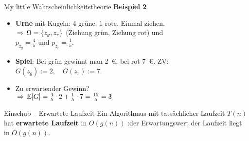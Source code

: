 \begin{frame}{My little Wahrscheinlichkeitstheorie} 
	\textbf{Beispiel 2} \\%
	\begin{itemize}
		\item \textbf{Urne} mit Kugeln: 4 grüne, 1 rote. Einmal ziehen. \\ \pause
		$\impl \Omega = \{z_g, z_r\}$ \quad (Ziehung grün, Ziehung rot) und \\ \pause
		$ p_{z_g} = \frac{4}{5}$ und $p_{z_r} = \frac{1}{5}$.
		\item \textbf{Spiel}:  Bei grün gewinnt man 2~€, bei rot 7~€. \quad ZV: \\ \pause
		$G(z_g) := 2, \quad  G(z_r) := 7$.
		\item Zu erwartender Gewinn? \\ \pause
		$\impl \E[G] = \frac{4}{5} \cdot 2 + \frac{1}{5} \cdot 7 = \fract 15/5 = 3$
	\end{itemize}
\end{frame}

\begin{frame}{Einschub – Erwartete Laufzeit}
	Ein Algorithmus mit tatsächlicher Laufzeit $T(n)$ hat \textbf{erwartete Laufzeit} in $O(g(n))$ :\gdw der Erwartungswert der Laufzeit liegt in $O(g(n))$.
\end{frame}

\iffalse
\begin{frame}{Datenstrukturen}
	\textbf{Freiheit für die Indizierung} \\[0,125cm]
	\begin{itemize}
		\pause
		\item Bisher: Für Index $i$ in einer Datenstruktur der Größe $n$ gilt $ i \in \{0, ..., n-1\} \subset \N_0$
		\pause
		\item Nun: Kein Index mehr
		\pause
		\item Stattdessen: Jedes Element $e$ hat einen eindeutigen Wert $key(e)$ derart, dass $\forall e, e': key(e) = key(e') \Leftrightarrow e = e'$ \\ (setze künftig Elementvergleiche synonym zu Vergleich der $keys$, auch mit $<$ und $>$)
		\pause
		\item Der $key(e)$ dient zum Finden von $e$ in der Datenstruktur, hat jedoch alleine keinen Aussagegehalt darüber, wo in der Datenstruktur $e$ sein Dasein fristet
	\end{itemize}
\end{frame}
\fi

